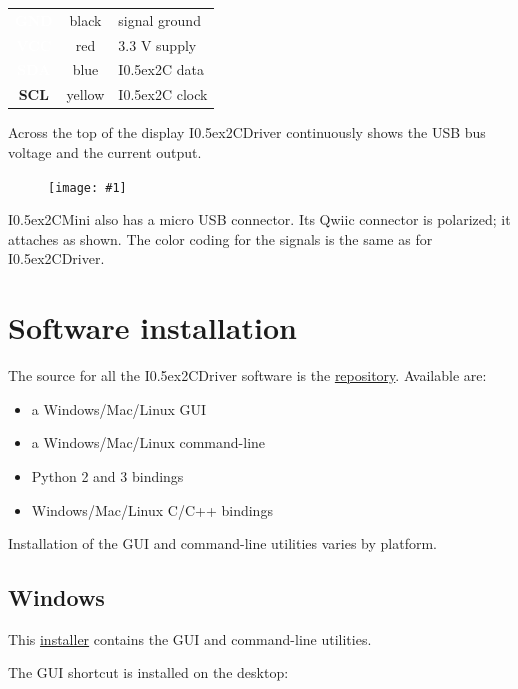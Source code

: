 \documentclass{article}
\newcommand{\two}{\raise0.5ex\hbox{\footnotesize{2}}}
\newcommand{\iic}{I\two{}C}
\newcommand{\iicdriver}{I\two{}CDriver}
\newcommand{\iicmini}{I\two{}CMini}
\newcommand{\png}[1]{
\begin{figure}[H]
\begin{center}
\texttt{[image: \#1]}
\end{center}
\end{figure}
}
\newcommand{\gap}{\vspace{10pt}}
\begin{document}
\gap
\begin{center}
\begin{tabular}{ccl}
\hline
\cellcolor{ccGND}
\textcolor{white}{\textbf{GND}}  & black & signal ground \\
\cellcolor{ccVCC}
\textcolor{white}{\textbf{VCC}}  & red & 3.3 V supply \\
\cellcolor{ccSDA}
\textcolor{white}{\textbf{SDA}}  & blue & \iic{} data \\
\cellcolor{ccSCL}
\textbf{SCL}  & yellow & \iic{} clock \\
\hline
\end{tabular}
\end{center}
\gap

Across the top of the display \iicdriver{} continuously shows
the USB bus voltage and the current output.

\png{img/i2cdriver/i2c_mini_topdown_wired_white_bg}

\iicmini{} also has a micro USB connector.
Its Qwiic connector is polarized; it attaches as shown.
The color coding for the signals is the same as for \iicdriver{}.

\newpage
\section{Software installation}

The source for all the \iicdriver{} software is the
\href{https://github.com/jamesbowman/i2cdriver}{repository}.
Available are:

\begin{itemize}
\item a Windows/Mac/Linux GUI
\item a Windows/Mac/Linux command-line
\item Python 2 and 3 bindings
\item Windows/Mac/Linux C/C++ bindings
\end{itemize}

Installation of the GUI and command-line utilities varies by platform.

\subsection{Windows}

This
\href{https://i2cdriver.com/windows}{installer}
contains the GUI and command-line utilities.

The GUI shortcut is installed on the desktop:
\end{document}
